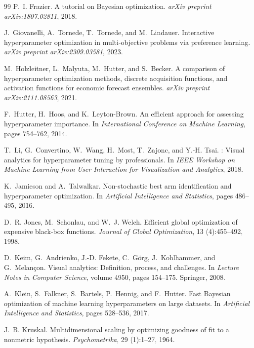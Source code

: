 \documentclass[11pt,a4paper]{ctexart}
\begin{document}
\begin{thebibliography}{99}
P.~I. Frazier.
\newblock A tutorial on {Bayesian} optimization.
\newblock \emph{arXiv preprint arXiv:1807.02811}, 2018.

J.~Giovanelli, A.~Tornede, T.~Tornede, and M.~Lindauer.
\newblock Interactive hyperparameter optimization in multi-objective problems via preference learning.
\newblock \emph{arXiv preprint arXiv:2309.03581}, 2023.

M.~Holzleitner, L.~Malyuta, M.~Hutter, and S.~Becker.
\newblock A comparison of hyperparameter optimization methods, discrete acquisition functions, and activation functions for economic forecast ensembles.
\newblock \emph{arXiv preprint arXiv:2111.08563}, 2021.

F.~Hutter, H.~Hoos, and K.~Leyton-Brown.
\newblock An efficient approach for assessing hyperparameter importance.
\newblock In \emph{International Conference on Machine Learning}, pages 754--762, 2014.

T.~Li, G.~Convertino, W.~Wang, H.~Most, T.~Zajonc, and Y.-H. Tsai.
: Visual analytics for hyperparameter tuning by professionals.
\newblock In \emph{IEEE Workshop on Machine Learning from User Interaction for Visualization and Analytics}, 2018.

K.~Jamieson and A.~Talwalkar.
\newblock Non-stochastic best arm identification and hyperparameter optimization.
\newblock In \emph{Artificial Intelligence and Statistics}, pages 486--495, 2016.

D.~R. Jones, M.~Schonlau, and W.~J. Welch.
\newblock Efficient global optimization of expensive black-box functions.
\newblock \emph{Journal of Global Optimization}, 13 (4):455--492, 1998.

D.~Keim, G.~Andrienko, J.-D. Fekete, C.~G{\"o}rg, J.~Kohlhammer, and G.~Melan{\c c}on.
\newblock Visual analytics: Definition, process, and challenges.
\newblock In \emph{Lecture Notes in Computer Science}, volume 4950, pages 154--175. Springer, 2008.

A.~Klein, S.~Falkner, S.~Bartels, P.~Hennig, and F.~Hutter.
\newblock Fast {Bayesian} optimization of machine learning hyperparameters on large datasets.
\newblock In \emph{Artificial Intelligence and Statistics}, pages 528--536, 2017.

J.~B. Kruskal.
\newblock Multidimensional scaling by optimizing goodness of fit to a nonmetric hypothesis.
\newblock \emph{Psychometrika}, 29 (1):1--27, 1964.


\end{thebibliography}
\end{document}
